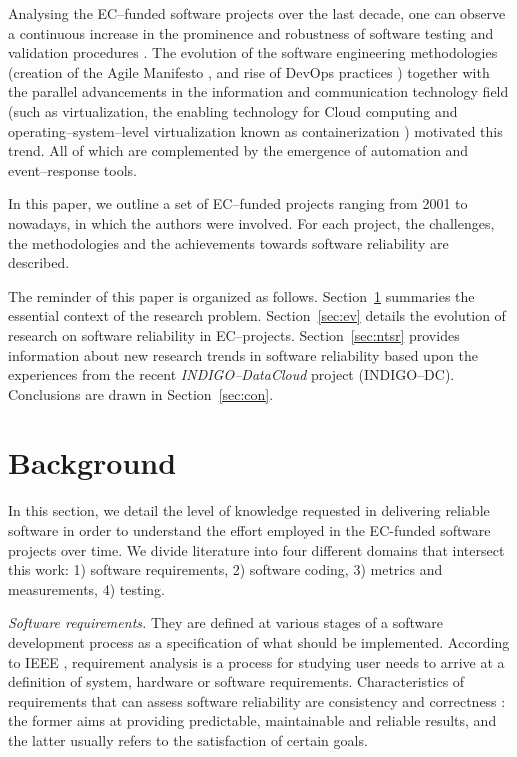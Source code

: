 \documentclass[journal]{IEEEtran}
\begin{document}
Analysing the EC--funded software projects over the last decade,
one can observe a continuous increase in the prominence and robustness of software
testing and validation procedures \cite{aiftimiei}. The
evolution of the software engineering methodologies (creation of the Agile
Manifesto \cite{agile-manifesto}, and rise of DevOps practices \cite{zhu}) together
with the parallel advancements in the information and communication technology
field (such as virtualization, the enabling technology for Cloud computing and
operating--system--level virtualization known as containerization \cite{soltesz}) motivated this trend. All of which
are complemented by the emergence of automation and event--response tools.

In this paper, we outline a set of EC--funded projects
ranging from 2001 to nowadays, in which the authors were involved.
For each project, the challenges, the methodologies and
the achievements towards software reliability are described.

The reminder of this paper is
organized as follows. Section~\ref{sec:b} summaries the essential context of the research problem. Section~\ref{sec:ev} details the evolution of research on
software reliability in EC--projects. Section~\ref{sec:ntsr} provides
information about new research trends in software reliability based upon the
experiences from the recent {\sl INDIGO--DataCloud} project (INDIGO--DC). Conclusions are drawn in Section~\ref{sec:con}.


\section{Background}
\label{sec:b}

In this section, we detail the level of knowledge requested in delivering reliable software in order 
to understand the effort employed in the EC-funded software projects over time. We divide literature 
into four different domains that intersect this work: 1) software requirements, 2) software coding,
3) metrics and measurements, 4) testing.

\emph{Software requirements.} They are defined at various stages of a software development process
as a specification of what should be implemented. According to IEEE \cite{radatz}, requirement
analysis is a process for studying user needs to arrive at a definition of system, hardware or software
requirements. Characteristics of requirements that can assess software reliability are consistency and
correctness \cite{sommerville}: the former aims at providing predictable, maintainable and reliable
results, and the latter usually refers to the satisfaction of certain goals.
\end{document}
